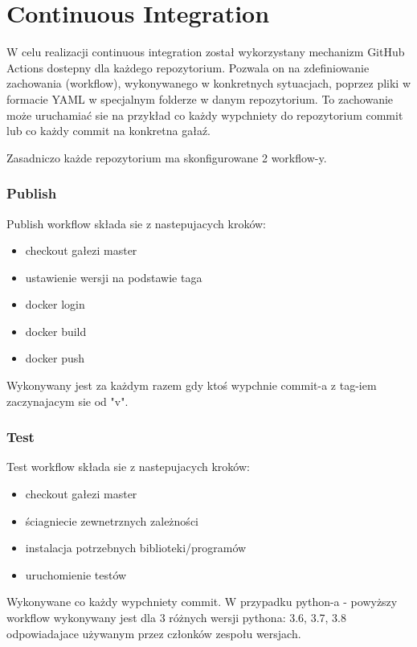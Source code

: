 \newpage
\section{Continuous Integration}

W celu realizacji continuous integration został wykorzystany mechanizm GitHub Actions dostepny dla każdego repozytorium. Pozwala on na zdefiniowanie zachowania (workflow), wykonywanego w konkretnych sytuacjach, poprzez pliki w formacie YAML w specjalnym folderze w danym repozytorium. To zachowanie może uruchamiać sie na przykład co każdy wypchniety do repozytorium commit lub co każdy commit na konkretna gałaź. 

Zasadniczo każde repozytorium ma skonfigurowane 2 workflow-y. 

\subsubsection{Publish}
Publish workflow składa sie z nastepujacych kroków:

\begin{itemize}
    \item checkout gałezi master
    \item ustawienie wersji na podstawie taga
    \item docker login
    \item docker build
    \item docker push
\end{itemize}

Wykonywany jest za każdym razem gdy ktoś wypchnie commit-a z tag-iem zaczynajacym sie od "v".

\subsubsection{Test}
Test workflow składa sie z nastepujacych kroków:
\begin{itemize}
    \item checkout gałezi master
    \item ściagniecie zewnetrznych zależności
    \item instalacja potrzebnych biblioteki/programów
    \item uruchomienie testów 
\end{itemize}

Wykonywane co każdy wypchniety commit. W przypadku python-a - powyższy workflow wykonywany jest dla 3 różnych wersji pythona: 3.6, 3.7, 3.8 odpowiadajace używanym przez członków zespołu wersjach.

